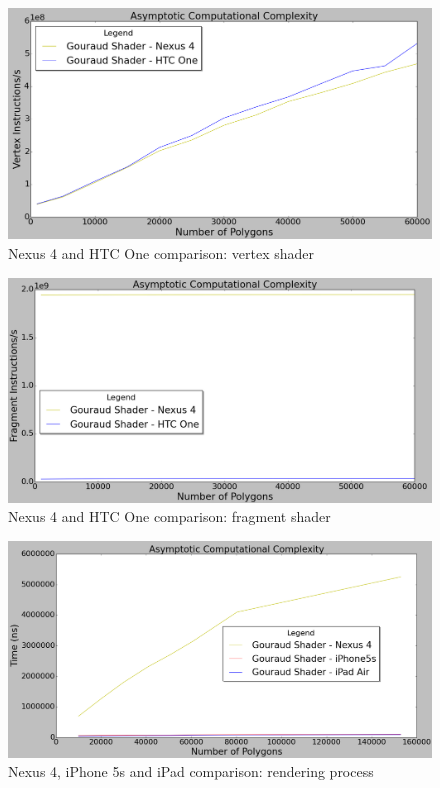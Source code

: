 \documentclass[10pt, conference, compsocconf]{IEEEtran}
\begin{document}
	\begin{figure}[!t]
	\centering
		\includegraphics[keepaspectratio=true,scale=0.27]{vertex_devices_all.png}
	\caption{Nexus 4 and HTC One comparison: vertex shader}
	\label{nexus_htc_vertex}
	\end{figure}
	
	\begin{figure}[!t]
	\centering
		\includegraphics[keepaspectratio=true,scale=0.27]{fragment_devices_all.png}
	\caption{Nexus 4 and HTC One comparison: fragment shader}
	\label{nexus_htc_fragment}
	\end{figure}
	
	\begin{figure}[!t]
	\centering
		\includegraphics[keepaspectratio=true,scale=0.25]{render_time_devices.png}
	\caption{Nexus 4, iPhone 5s and iPad comparison: rendering process}
	\label{nexus_ios}
	\end{figure}	
\end{document}
